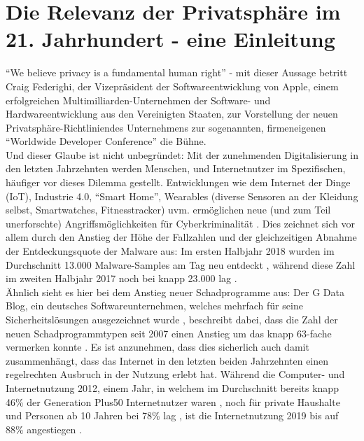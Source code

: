 \chapter{Die Relevanz der Privatsphäre im 21. Jahrhundert - eine Einleitung} %
\label{Introduction} %

\enquote{We believe privacy is a fundamental human right} \cite{Apple:2020aa} - mit dieser Aussage betritt Craig Federighi, der Vizepräsident der Softwareentwicklung von Apple, einem erfolgreichen Multimilliarden-Unternehmen der Software- und Hardwareentwicklung aus den Vereinigten Staaten, zur Vorstellung der 
neuen Privatsphäre-Richtliniendes Unternehmens zur sogenannten, firmeneigenen \enquote{Worldwide Developer Conference} die Bühne. \\ Und dieser Glaube ist nicht unbegründet: Mit der zunehmenden Digitalisierung in den letzten Jahrzehnten werden Menschen, und Internetnutzer im Spezifischen, 
häufiger vor dieses Dilemma gestellt. Entwicklungen wie dem Internet der Dinge (IoT), Industrie 4.0, \enquote{Smart Home}, Wearables (diverse Sensoren an der Kleidung selbst, Smartwatches, Fitnesstracker) uvm. ermöglichen neue (und zum Teil unerforschte) Angriffsmöglichkeiten für Cyberkriminalität \cite{Bundeskriminalamt:2018aa}.
Dies zeichnet sich vor allem durch den Anstieg der Höhe der Fallzahlen und der gleichzeitigen Abnahme der Entdeckungsquote der Malware aus: Im ersten Halbjahr 2018 wurden im Durchschnitt 13.000 Malware-Samples am Tag neu entdeckt \cite{GDB:18}, während diese Zahl im zweiten Halbjahr 2017 noch bei knapp 23.000 lag \cite{GDB:17}. \\ Ähnlich sieht es hier bei
dem Anstieg neuer Schadprogramme aus: Der G Data Blog, ein deutsches Softwareunternehmen, welches mehrfach für seine Sicherheitslösungen ausgezeichnet wurde \cite{GD:2020aa}, beschreibt dabei, dass die Zahl der neuen Schadprogrammtypen seit 2007 einen Anstieg um das knapp 63-fache vermerken konnte \cite{GDB:17}. 
Es ist anzunehmen, dass dies sicherlich auch damit zusammenhängt, dass das Internet in den letzten beiden Jahrzehnten einen regelrechten Ausbruch in der Nutzung erlebt hat. Während die Computer- und Internetnutzung 2012, einem Jahr, in welchem im Durchschnitt bereits knapp 46\% der Generation Plus50 Internetnutzer waren
\cite{GfK:2016aa}, noch für private Haushalte und Personen ab 10 Jahren bei 78\% lag \cite{Bundesamt:2019aa}, ist die Internetnutzung 2019 bis auf 88\% angestiegen \cite{Bundesamt:2019aa}. \\ \\
